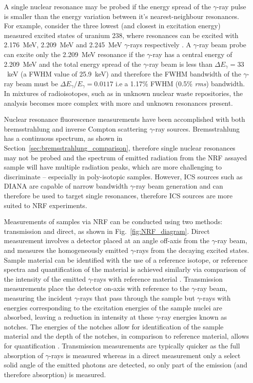 \documentclass[../main.tex]{subfiles}
\begin{document}
A single nuclear resonance may be probed if the energy spread of the $\gamma$-ray pulse is smaller than the energy variation between it's nearest-neighbour resonances. For example, consider the three lowest (and closest in excitation energy) measured excited states of uranium 238, where resonances can be excited with 2.176~\si{\mega\electronvolt}, 2.209~\si{\mega\electronvolt} and 2.245~\si{\mega\electronvolt} $\gamma$-rays respectively \cite{quiter2011transmission}. A $\gamma$-ray beam probe can excite only the 2.209~\si{\mega\electronvolt} resonance if the $\gamma$-ray has a central energy of 2.209~\si{\mega\electronvolt} and the total energy spread of the $\gamma$-ray beam is less than $\Delta E_{\gamma} = 33$~\si{\kilo\electronvolt} (a FWHM value of 25.9~\si{\kilo\electronvolt}) and therefore the FWHM bandwidth of the $\gamma$-ray beam must be $\Delta E_{\gamma}/E_{\gamma} = 0.0117$ i.e a 1.17\% FWHM (0.5\% \textit{rms}) bandwidth. In mixtures of radioisotopes, such as in unknown nuclear waste repositories, the analysis becomes more complex with more and unknown resonances present. 

Nuclear resonance fluorescence measurements have been accomplished with both bremsstrahlung \cite{bertozzi2005nuclear} and inverse Compton scattering \cite{angell2015demonstration} $\gamma$-ray sources. Bremsstrahlung has a continuous spectrum, as shown in Section~\ref{sec:bremsstrahlung_comparison}, therefore single nuclear resonances may not be probed and the spectrum of emitted radiation from the NRF assayed sample will have multiple radiation peaks, which are more challenging to discriminate -- especially in poly-isotopic samples. However, ICS sources such as DIANA are capable of narrow bandwidth $\gamma$-ray beam generation and can therefore be used to target single resonances, therefore ICS sources are more suited to NRF experiments.  

Measurements of samples via NRF can be conducted using two methods: transmission and direct, as shown in Fig.~\ref{fig:NRF_diagram}. Direct measurement involves a detector placed at an angle off-axis from the $\gamma$-ray beam, and measures the homogeneously emitted $\gamma$-rays from the decaying excited states. Sample material can be identified with the use of a reference isotope, or reference spectra and quantification of the material is achieved similarly via comparison of the intensity of the emitted $\gamma$-rays with reference material \cite{angell2015demonstration}. Transmission measurements place the detector on-axis with reference to the $\gamma$-ray beam, measuring the incident $\gamma$-rays that pass through the sample but $\gamma$-rays with energies corresponding to the excitation energies of the sample nuclei are absorbed, leaving a reduction in intensity at these $\gamma$-ray energies known as notches. The energies of the notches allow for identification of the sample material and the depth of the notches, in comparison to reference material, allows for quantification \cite{pruet2006detecting}. Transmission measurements are typically quicker as the full absorption of $\gamma$-rays is measured whereas in a direct measurement only a select solid angle of the emitted photons are detected, so only part of the emission (and therefore absorption) is measured.
\end{document}

